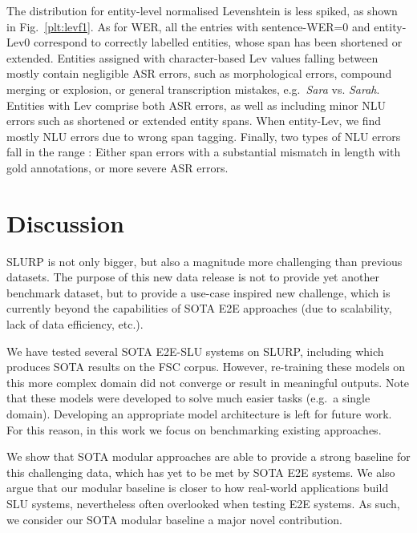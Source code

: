 \documentclass[11pt,a4paper]{article}
\newcommand{\datasetacr}{SLURP}
\newcommand{\etoe}{E2E}
\newcommand{\slu}{SLU}
\newcommand{\asr}{ASR}
\newcommand{\nlu}{NLU}
\begin{document}
The distribution for entity-level normalised Levenshtein is less spiked, as shown in Fig.\ \ref{plt:levf1}. As for WER, all the entries with sentence-WER=0 and entity-Lev0 correspond to correctly labelled entities, whose span has been shortened or extended. 
Entities assigned with character-based Lev values falling between  mostly contain negligible ASR errors, such as morphological errors, compound merging or explosion, or general transcription mistakes, e.g.\ \textit{Sara} vs. \textit{Sarah}. Entities with Lev comprise both \asr{} errors, as well as including minor \nlu{} errors such as shortened or extended entity spans. When entity-Lev, we find mostly \nlu{} errors due to wrong span tagging. Finally, two types of \nlu{} errors fall in the range : Either span errors with a substantial mismatch in length with gold annotations, or more severe \asr{} errors. 







\section{Discussion}
\label{sec:discussion}

\datasetacr{} is not only bigger, but also a magnitude more challenging than previous datasets. The purpose of this new data release is not to provide yet another benchmark dataset, but to provide a use-case inspired new challenge, which is currently beyond the capabilities of SOTA E2E approaches (due to scalability, lack of data efficiency, etc.). 

We have tested several SOTA \etoe-\slu{} systems on \datasetacr, including \cite{lugosh19:Interspeech} which produces SOTA results on the FSC corpus. However, re-training these models on this more complex domain did not converge or result in meaningful outputs. Note that these models were developed to solve much easier tasks (e.g.\ a single domain). Developing an appropriate model architecture is left for future work. For this reason, in this work we focus on benchmarking existing approaches.

We show that SOTA modular approaches are able to provide a strong baseline for this challenging data, which has yet to be met by SOTA E2E systems. We also argue that our modular baseline is closer to how real-world applications build SLU systems, nevertheless often overlooked when testing E2E systems. As such, we consider our SOTA modular baseline a major novel contribution.
\end{document}
